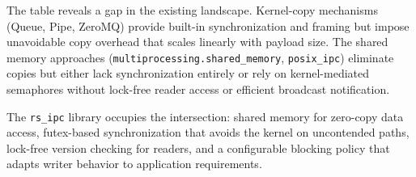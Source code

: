 The table reveals a gap in the existing landscape. Kernel-copy mechanisms (Queue, Pipe, ZeroMQ) provide built-in synchronization and framing but impose unavoidable copy overhead that scales linearly with payload size. The shared memory approaches (\texttt{multiprocessing.shared\_memory}, \texttt{posix\_ipc}) eliminate copies but either lack synchronization entirely or rely on kernel-mediated semaphores without lock-free reader access or efficient broadcast notification.

The \texttt{rs\_ipc} library occupies the intersection: shared memory for zero-copy data access, futex-based synchronization that avoids the kernel on uncontended paths, lock-free version checking for readers, and a configurable blocking policy that adapts writer behavior to application requirements.

